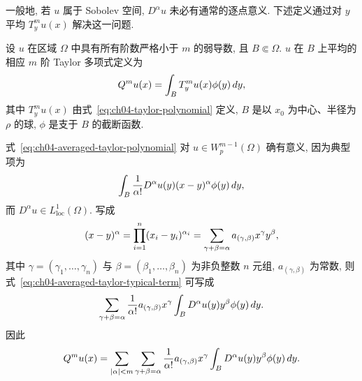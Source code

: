 一般地, 若 $u$ 属于 Sobolev 空间, $D^\alpha u$ 未必有通常的逐点意义. 下述定义通过对 $y$ 平均 $T_y^m u(x)$ 解决这一问题.

\setcounter{thmcount}{2}
\begin{Definition}
\label{def:ch04-averaged-taylor-polynomial}
设 $u$ 在区域 $\Omega$ 中具有所有阶数严格小于 $m$ 的弱导数, 且 $B\Subset\Omega$. $u$ 在 $B$ 上平均的相应 $m$ 阶 Taylor 多项式定义为
\begin{equation}
\MathBookFormulaID{formula-ch04-averaged-taylor-polynomial}
\label{eq:ch04-averaged-taylor-polynomial}
Q^m u(x)=\int_BT_y^m u(x)\phi(y)\,dy,
\end{equation}
其中 $T_y^m u(x)$ 由式~\eqref{eq:ch04-taylor-polynomial} 定义, $B$ 是以 $x_0$ 为中心、半径为 $\rho$ 的球, $\phi$ 是支于 $B$ 的截断函数.
\end{Definition}

式~\eqref{eq:ch04-averaged-taylor-polynomial} 对 $u\in W_p^{m-1}(\Omega)$ 确有意义, 因为典型项为
\begin{equation}
\MathBookFormulaID{formula-ch04-averaged-taylor-typical-term}
\label{eq:ch04-averaged-taylor-typical-term}
\int_B\frac1{\alpha!}D^\alpha u(y)(x-y)^\alpha\phi(y)\,dy,
\end{equation}
而 $D^\alpha u\in L^1_{\mathrm{loc}}(\Omega)$. 写成
\begin{equation}
\MathBookFormulaID{formula-ch04-multiindex-binomial-expansion}
\label{eq:ch04-multiindex-binomial-expansion}
(x-y)^\alpha=\prod_{i=1}^n(x_i-y_i)^{\alpha_i}
=\sum_{\gamma+\beta=\alpha}a_{(\gamma,\beta)}x^\gamma y^\beta,
\end{equation}
其中 $\gamma=(\gamma_1,\ldots,\gamma_n)$ 与 $\beta=(\beta_1,\ldots,\beta_n)$ 为非负整数 $n$ 元组, $a_{(\gamma,\beta)}$ 为常数, 则式~\eqref{eq:ch04-averaged-taylor-typical-term} 可写成
\begin{equation}
\MathBookFormulaID{formula-ch04-averaged-taylor-typical-term-expanded}
\label{eq:ch04-averaged-taylor-typical-term-expanded}
\sum_{\gamma+\beta=\alpha}\frac1{\alpha!}a_{(\gamma,\beta)}x^\gamma
\int_BD^\alpha u(y)y^\beta\phi(y)\,dy.
\end{equation}
因此
\begin{equation}
\MathBookFormulaID{formula-ch04-averaged-taylor-expanded}
\label{eq:ch04-averaged-taylor-expanded}
Q^m u(x)=\sum_{|\alpha|<m}\sum_{\gamma+\beta=\alpha}
\frac1{\alpha!}a_{(\gamma,\beta)}x^\gamma
\int_BD^\alpha u(y)y^\beta\phi(y)\,dy.
\end{equation}

